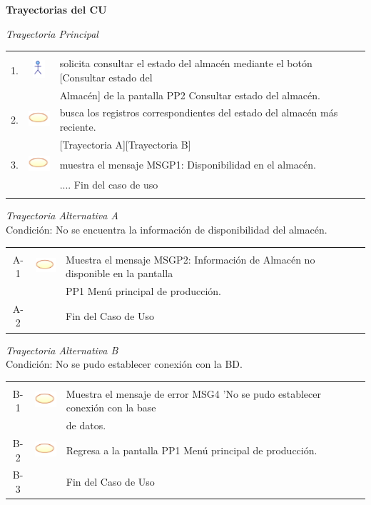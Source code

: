 \documentclass[10pt,spanish]{article}
\providecommand{\tabularnewline}{\\}
\begin{document}
	\textbf{\large Trayectorias del CU}{\large \par}

	\textit{\large Trayectoria Principal}{\large{} }{\large \par}

	\begin{tabular}{ccl}
	&  & \tabularnewline
	1. & \includegraphics{actor} & solicita consultar el estado del almacén mediante el botón [Consultar estado del\tabularnewline
	& & Almacén] de la pantalla PP2 Consultar estado del almacén.\tabularnewline
	2. & \includegraphics{sistema} &  busca los registros correspondientes del estado del almacén más reciente. \tabularnewline
	& & [Trayectoria A][Trayectoria B]\tabularnewline
	3. & \includegraphics{sistema} & muestra el mensaje MSGP1: Disponibilidad en el almacén.\tabularnewline
	 &  & .... Fin del caso de uso\tabularnewline \\
	\end{tabular}
	\newpage
	\textit{Trayectoria Alternativa A}\\
	Condición: No se encuentra la información de disponibilidad del almacén.\\
	\begin{tabular}{ccl}
	& & \tabularnewline
	A-1 & \includegraphics{sistema} & Muestra el mensaje MSGP2: Información de Almacén no disponible en la pantalla \tabularnewline
	& & PP1 Menú principal de producción.\tabularnewline
	A-2 & & Fin del Caso de Uso\tabularnewline
	\end{tabular}
	\newline
	\textit{Trayectoria Alternativa B}\\
	Condición: No se pudo establecer conexión con la BD.\\
	\begin{tabular}{ccl}
	& & \tabularnewline
	B-1 & \includegraphics{sistema} & Muestra el mensaje de error MSG4 'No se pudo establecer conexión con la base\tabularnewline
	& & de datos.\tabularnewline
	B-2 & \includegraphics{sistema} & Regresa a la pantalla PP1 Menú principal de producción.\tabularnewline
	B-3 & & Fin del Caso de Uso\tabularnewline	
	\end{tabular}
\end{document}
